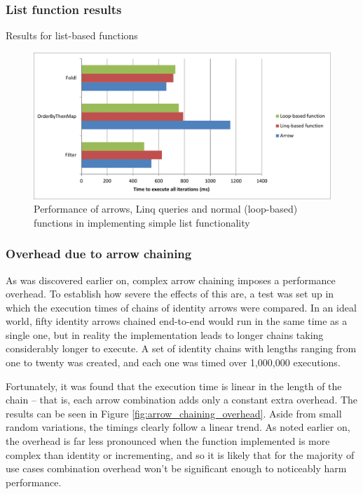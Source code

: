 \documentclass[12pt,twoside,notitlepage]{report}
\begin{document}
\subsubsection{List function results}

Results for list-based functions

\begin{figure}[!ht]
  \centering
  \includegraphics[width=\textwidth]{fig/ListFunctionPerformanceChart.pdf}
  \caption{Performance of arrows, Linq queries and normal (loop-based) functions in implementing simple list functionality}
  \label{fig:list_function_performance}
\end{figure}

\subsubsection{Overhead due to arrow chaining}
\label{sec:arrow_chaining_overhead}

As was discovered earlier on, complex arrow chaining imposes a performance overhead. To establish how severe the effects of this are, a test was set up in which the execution times of chains of identity arrows were compared. In an ideal world, fifty identity arrows chained end-to-end would run in the same time as a single one, but in reality the implementation leads to longer chains taking considerably longer to execute. A set of identity chains with lengths ranging from one to twenty was created, and each one was timed over 1,000,000 executions.

Fortunately, it was found that the execution time is linear in the length of the chain -- that is, each arrow combination adds only a constant extra overhead. The results can be seen in Figure \ref{fig:arrow_chaining_overhead}. Aside from small random variations, the timings clearly follow a linear trend. As noted earlier on, the overhead is far less pronounced when the function implemented is more complex than identity or incrementing, and so it is likely that for the majority of use cases combination overhead won't be significant enough to noticeably harm performance.
\end{document}
